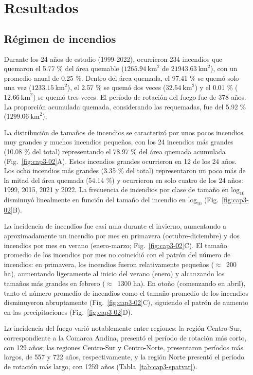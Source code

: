 \section{Resultados}

\subsection{Régimen de incendios}\label{cap3:patrones-regimen}

Durante los 24 años de estudio (1999-2022), ocurrieron 234 incendios que quemaron el 5.77 \% del área quemable ($1265.94\ \text{km}^2$ de $21943.63\ \text{km}^2$), con un promedio anual de 0.25 \%. Dentro del área quemada, el 97.41 \% se quemó solo una vez ($1233.15\ \text{km}^2$), el 2.57 \% se quemó dos veces ($32.54\  \text{km}^2$) y el 0.01 \% ($12.66\  \text{km}^2$) se quemó tres veces. El período de rotación del fuego fue de 378 años. La proporción acumulada quemada, considerando las requemadas, fue del 5.92 \% ($1299.06\  \text{km}^2$).

La distribución de tamaños de incendios se caracterizó por unos pocos incendios muy grandes y muchos incendios pequeños, con los 24 incendios más grandes (10.08 \% del total) representando el 78.97 \% del área quemada acumulada (Fig.~\ref{fig:cap3-02}A). Estos incendios grandes ocurrieron en 12 de los 24 años. Los ocho incendios más grandes (3.35 \% del total) representaron un poco más de la mitad del área quemada (54.14 \%) y ocurrieron en solo cuatro de los 24 años: 1999, 2015, 2021 y 2022. La frecuencia de incendios por clase de tamaño en $\text{log}_{10}$ disminuyó linealmente en función del tamaño del incendio en $\text{log}_{10}$ (Fig.~\ref{fig:cap3-02}B).

La incidencia de incendios fue casi nula durante el invierno, aumentando a aproximadamente un incendio por mes en primavera (octubre-diciembre) y dos incendios por mes en verano (enero-marzo; Fig.~\ref{fig:cap3-02}C). El tamaño promedio de los incendios por mes no coincidió con el patrón del número de incendios: en primavera, los incendios fueron relativamente pequeños ($\approx$~200 ha), aumentando ligeramente al inicio del verano (enero) y alcanzando los tamaños más grandes en febrero ($\approx$~1300 ha). En otoño (comenzando en abril), tanto el número promedio de incendios como el tamaño promedio de los incendios disminuyeron abruptamente (Fig.~\ref{fig:cap3-02}C), siguiendo el patrón de aumento en las precipitaciones (Fig.~\ref{fig:cap3-02}D).

La incidencia del fuego varió notablemente entre regiones: la región Centro-Sur, correspondiente a la Comarca Andina, presentó el período de rotación más corto, con 129 años; las regiones Centro-Sur y Centro-Norte, presentaron períodos más largos, de 557 y 722 años, respectivamente, y la región Norte presentó el período de rotación más largo, con 1259 años (Tabla~\ref{tab:cap3-spatvar}).

